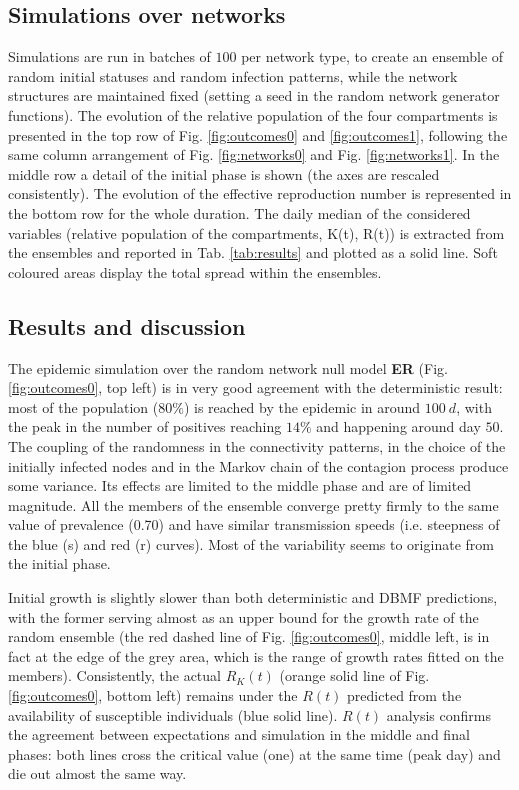 \documentclass[DIV=12, BCOR=0pt]{scrartcl}  %
\begin{document}
  \subsection{Simulations over networks}
  Simulations are run in batches of $100$ per network type, to create an ensemble of random initial statuses and random infection patterns, while the network structures are maintained fixed (setting a seed in the random network generator functions). The evolution of the relative population of the four compartments is presented in the top row of Fig. \ref{fig:outcomes0} and \ref{fig:outcomes1}, following the same column arrangement of Fig. \ref{fig:networks0} and Fig. \ref{fig:networks1}. In the middle row a detail of the initial phase is shown (the axes are rescaled consistently). The evolution of the effective reproduction number is represented in the bottom row for the whole duration. The daily median of the considered variables (relative population of the compartments, K(t), R(t)) is extracted from the ensembles and reported in Tab. \ref{tab:results} and plotted as a solid line. Soft coloured areas display the total spread within the ensembles.
  
  
  \subsection{Results and discussion}
  The epidemic simulation over the random network null model \textbf{ER} (Fig. \ref{fig:outcomes0}, top left) is in very good agreement with the deterministic result: most of the population ($80 \%$) is reached by the epidemic in around $100 \ d$, with the peak in the number of positives reaching $14 \%$ and happening around day $50$. The coupling of the randomness in the connectivity patterns, in the choice of the initially infected nodes and in the Markov chain of the contagion process produce some variance. Its effects are limited to the middle phase and are of limited magnitude. All the members of the ensemble converge pretty firmly to the same value of prevalence (0.70) and have similar transmission speeds (i.e. steepness of the blue (s) and red (r) curves). Most of the variability seems to originate from the initial phase.
  
  Initial growth is slightly slower than both deterministic and DBMF predictions, with the former serving almost as an upper bound for the growth rate of the random ensemble (the red dashed line of Fig. \ref{fig:outcomes0}, middle left, is in fact at the edge of the grey area, which is the range of growth rates fitted on the members). Consistently, the actual $R_K(t)$ (orange solid line of Fig. \ref{fig:outcomes0}, bottom left) remains under the $R(t)$ predicted from the availability of susceptible individuals (blue solid line). $R(t)$ analysis confirms the agreement between expectations and simulation in the middle and final phases: both lines cross the critical value (one) at the same time (peak day) and die out almost the same way.
  
\end{document}
